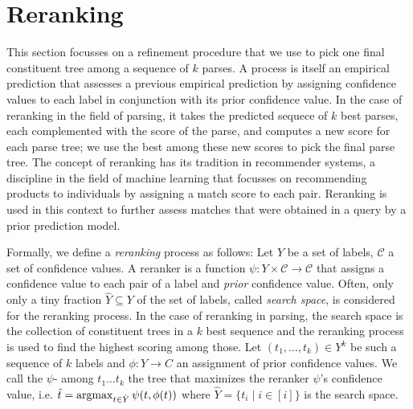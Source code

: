 \documentclass[../document.tex]{subfiles}
\begin{document}
    \section{Reranking}
    This section focusses on a refinement procedure that we use to pick one final constituent tree among a sequence of \(k\) parses.
    A  process is itself an empirical prediction that assesses a previous empirical prediction by assigning confidence values to each label in conjunction with its prior confidence value.
    In the case of reranking in the field of parsing, it takes the predicted sequece of \(k\) best parses, each complemented with the score of the parse, and computes a new score for each parse tree; we use the best among these new scores to pick the final parse tree.
    The concept of reranking has its tradition in recommender systems, a discipline in the field of machine learning that focusses on recommending products to individuals by assigning a match score to each pair.
    Reranking is used in this context to further assess matches that were obtained in a query by a prior prediction model. \citep{???}
    
    Formally, we define a \emph{reranking} process as follows:
        Let \(Y\) be a set of labels, \(\mathcal{C}\) a set of confidence values.
        A reranker is a function \(\psi \colon Y \times \mathcal{C} \to \mathcal{C}\) that assigns a confidence value to each pair of a label and \emph{prior} confidence value.
    Often, only only a tiny fraction \(\hat{Y} \subseteq Y\) of the set of labels, called \emph{search space}, is considered for the reranking process.
    In the case of reranking in parsing, the search space is the collection of constituent trees in a \(k\) best sequence and the reranking process is used to find the highest scoring among those.
    Let \((t_1, \ldots, t_k) \in Y^k\) be such a sequence of \(k\) labels and \(\phi \colon Y \to C\) an assignment of prior confidence values.
    We call the \(\psi\)- among \(t_1 \ldots t_k\) the tree that maximizes the reranker \(\psi\)'s confidence value, i.e. \(
        \hat{t} = \operatorname{arg max}_{t \in \hat{Y}} \psi(t, \phi(t))
    \) where \(\hat{Y} = \{t_i \mid i \in [i]\}\) is the search space.
    
\end{document}
